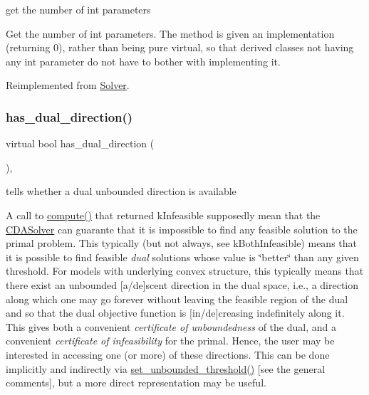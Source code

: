 get the number of int parameters 

Get the number of int parameters. The method is given an implementation (returning 0), rather than being pure virtual, so that derived classes not having any int parameter do not have to bother with implementing it. 

Reimplemented from \mbox{\hyperlink{class_s_m_spp__di__unipi__it_1_1_solver_a3ad74d9506761eb2ca4c8a936fb7a1c5}{Solver}}.

\mbox{\label{class_s_m_spp__di__unipi__it_1_1_c_d_a_solver_a4247feaa72c255f28a2a71b5e634b60a}} 
\subsubsection{\texorpdfstring{has\+\_\+dual\+\_\+direction()}{has\_dual\_direction()}}
{\footnotesize\ttfamily virtual bool has\+\_\+dual\+\_\+direction (\begin{DoxyParamCaption}\item[{void}]{ }\end{DoxyParamCaption})\hspace{0.3cm}{\ttfamily [inline]}, {\ttfamily [virtual]}}



tells whether a dual unbounded direction is available 

A call to \mbox{\hyperlink{class_s_m_spp__di__unipi__it_1_1_solver_a504d4e3e174c7a518cc66156a8a45ce5}{compute()}} that returned k\+Infeasible supposedly mean that the \mbox{\hyperlink{class_s_m_spp__di__unipi__it_1_1_c_d_a_solver}{C\+D\+A\+Solver}} can guarante that it is impossible to find any feasible solution to the primal problem. This typically (but not always, see k\+Both\+Infeasible) means that it is possible to find feasible {\itshape dual} solutions whose value is \char`\"{}better\char`\"{} than any given threshold. For models with underlying convex structure, this typically means that there exist an unbounded \mbox{[}a/de\mbox{]}scent direction in the dual space, i.\+e., a direction along which one may go forever without leaving the feasible region of the dual and so that the dual objective function is \mbox{[}in/de\mbox{]}creasing indefinitely along it. This gives both a convenient {\itshape certificate of unboundedness} of the dual, and a convenient {\itshape certificate of infeasibility} for the primal. Hence, the user may be interested in accessing one (or more) of these directions. This can be done implicitly and indirectly via \mbox{\hyperlink{class_s_m_spp__di__unipi__it_1_1_solver_ae1717d1363782e086aa797e7437c0352}{set\+\_\+unbounded\+\_\+threshold()}} \mbox{[}see the general comments\mbox{]}, but a more direct representation may be useful.

